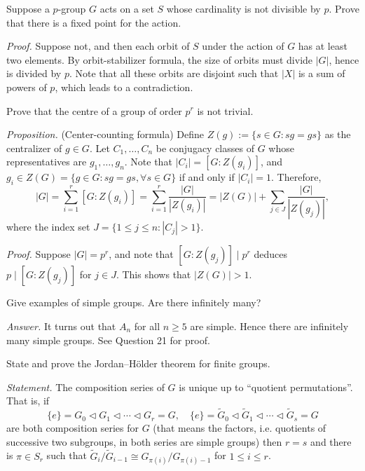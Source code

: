 \documentclass{mathproblems}
\begin{document}
\begin{questions}

\miquestion
{\color{blue} Suppose a $p$-group $G$ acts on a set $S$ whose cardinality is not divisible by $p$. Prove that there is a fixed point for the action.}

\textit{Proof.} Suppose not, and then each orbit of $S$ under the action of $G$ has at least two elements. By orbit-stabilizer formula, the size of orbits must divide $|G|$, hence is divided by $p$. Note that all these orbits are disjoint such that $|X|$ is a sum of powers of $p$, which leads to a contradiction.

\miquestion
{\color{blue} Prove that the centre of a group of order $p^r$ is not trivial.}

{\color{violet}
\textit{Proposition.} (Center-counting formula) Define $Z(g):=\{s\in G: sg=gs\}$ as the centralizer of $g\in G$. Let $C_1,\ldots,C_n$ be conjugacy classes of $G$ whose representatives are $g_1,\ldots,g_n$. Note that $|C_i|=[G:Z(g_i)]$, and $g_i\in Z(G)=\{g\in G: sg=gs,\forall s\in G\}$ if and only if $|C_i|=1$. Therefore,
$$
|G|=\sum_{i=1}^{r}[G: Z(g_{i})]=\sum_{i=1}^{r} \frac{|G|}{|Z(g_{i})|}=|Z(G)|+\sum_{j\in J}\frac{|G|}{|Z(g_{j})|},
$$
where the index set $J=\{1\leq j\leq n: |C_j|>1\}$. 
}

\textit{Proof.} Suppose $|G|=p^r$, and note that $[G:Z(g_j)]\mid p^r$ deduces $p\mid [G:Z(g_j)]$ for $j\in J$. This shows that $|Z(G)|>1$.


\miquestion
{\color{blue} Give examples of simple groups. Are there infinitely many?}

\textit{Answer.} It turns out that $A_n$ for all $n\geq 5$ are simple. Hence there are infinitely many simple groups. See Question 21 for proof.

\miquestion
{\color{blue} State and prove the Jordan--H\"older theorem for finite groups.}

\textit{Statement.} The composition series of $G$ is unique up to ``quotient permutations''. That is, if
$$
\{e\}=G_{0} \triangleleft G_{1} \triangleleft \cdots \triangleleft G_{r}=G,\quad \{e\}=\widetilde{G}_{0} \triangleleft \widetilde{G}_{1} \triangleleft \cdots \triangleleft \widetilde{G}_{s}=G
$$
are both composition series for $G$ (that means the factors, i.e. quotients of successive two subgroups, in both series are simple groups) then $r=s$ and there is $\pi \in S_{r}$ such that $\widetilde{G}_{i} / \widetilde{G}_{i-1} \cong G_{\pi(i)} / G_{\pi(i)-1}$ for $1 \leq i \leq r$.


\end{questions}
\end{document}
